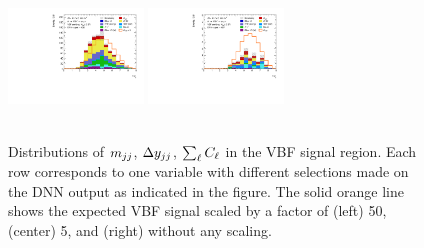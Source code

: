 \begin{figure}[ht]
{            \includegraphics[width=0.32\textwidth]{figures/hww/dnn/blinded/run2-emme-CutVBFSR_DNN25-DYjj-lin.pdf} \hfill
            \includegraphics[width=0.32\textwidth]{figures/hww/dnn/blinded/run2-emme-CutVBFSR_DNN87-DYjj-lin.pdf}
        } \\
         \\
        {\caption{Distributions of $m_{jj}$, $\Delta y_{jj}$, $\sum_\ell C_\ell$ in the VBF \TwoJet signal region.
            Each row corresponds to one variable with different selections made on the DNN output as indicated in the figure. The solid orange line shows the expected VBF signal scaled by a factor of (left) 50, (center) 5, and (right) without any scaling.
            \label{fig:dnn-inputs-vbf-top1} }}
    \end{figure}


